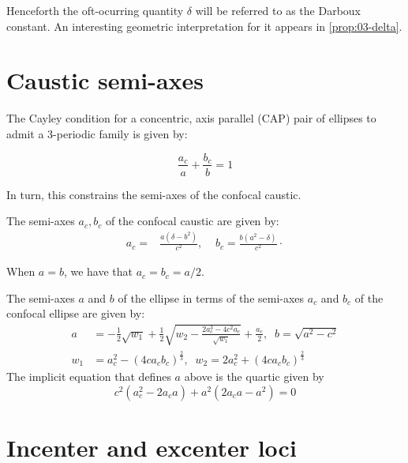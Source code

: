 Henceforth the oft-ocurring quantity $\delta$ will be referred to as the Darboux constant. An interesting geometric interpretation for it appears in \cref{prop:03-delta}.


\section{Caustic semi-axes}

The Cayley condition for a concentric, axis parallel (CAP) pair of ellipses to admit a 3-periodic family is given by:

\begin{equation} \frac{a_c}{a}+\frac{b_c}{b}=1
\label{eqn:n3-cayley}
\end{equation}

In turn, this constrains the semi-axes of the confocal caustic.

\begin{proposition}
The semi-axes $a_c,b_c$ of the confocal caustic are given by:
\begin{align*}
a_c=&\frac{a\left(\delta-{b}^{2}\right)}{c^2},\;\;\;\;
b_c=\frac{b\left({a}^{2}-\delta\right)}{c^2}\cdot
\end{align*}
\label{prop:03-n3-caustic}
\end{proposition}

When $a=b$, we have that $a_c=b_c=a/2$.

\begin{proposition}
The semi-axes $a$ and $b$ of the ellipse in terms of the semi-axes $a_c$ and $b_c$ of the confocal ellipse are given by:
\begin{align*}
a&= -\frac{1}{2} \sqrt{w_1} + \frac{1}{2} \sqrt{ w_2 -\frac{ 2 a_c^3 - 4 c^2a_c}{\sqrt{w_1}} } +\frac{a_c}{2},\;\; b=\sqrt{a^2-c^2}\\
w_1&=a_c^2-(4 c a_c b_c)^{\frac{2}{3}},\;\; w_2=2 a_c^2+ (4 c a_c b_c)^{\frac{2}{3}}
\end{align*}
The implicit equation that defines $a$ above is the quartic  given by
\[c^2( a_c^2   - 2   a_c   a )+ a^2(2a_c a  - a^2)=0\]
\label{prop:03-caustic-to-billiard}
\end{proposition}

\section{Incenter and excenter loci}
\label{sec:03-inc-exc-loci}

